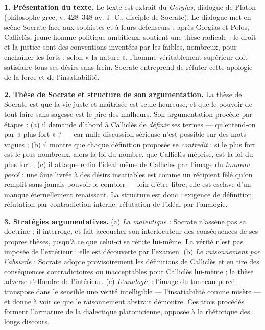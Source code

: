 \documentclass[11pt]{article}
\begin{document}
\begin{corrige}
\tcblower

\textbf{1. Présentation du texte.} Le texte est extrait du \emph{Gorgias}, dialogue de Platon (philosophe grec, v. 428--348 av. J.-C., disciple de Socrate). Le dialogue met en scène Socrate face aux sophistes et à leurs défenseurs : après Gorgias et Polos, Calliclès, jeune homme politique ambitieux, soutient une thèse radicale : le droit et la justice sont des conventions inventées par les faibles, nombreux, pour enchaîner les forts ; selon « la nature », l'homme véritablement supérieur doit satisfaire tous ses désirs sans frein. Socrate entreprend de réfuter cette apologie de la force et de l'insatiabilité.

\textbf{2. Thèse de Socrate et structure de son argumentation.} La thèse de Socrate est que la vie juste et maîtrisée est seule heureuse, et que le pouvoir de tout faire sans sagesse est le pire des malheurs. Son argumentation procède par étapes : (a) il demande d'abord à Calliclès de \emph{définir} ses termes --- qu'entend-on par « plus fort » ? --- car nulle discussion sérieuse n'est possible sur des mots vagues ; (b) il montre que chaque définition proposée se \emph{contredit} : si le plus fort est le plus nombreux, alors la loi du nombre, que Calliclès méprise, est la loi du plus fort ; (c) il attaque enfin l'idéal même de Calliclès par l'image du \emph{tonneau percé} : une âme livrée à des désirs insatiables est comme un récipient fêlé qu'on remplit sans jamais pouvoir le combler --- loin d'être libre, elle est esclave d'un manque éternellement renaissant. La structure est donc : exigence de définition, réfutation par contradiction interne, réfutation de l'idéal par l'analogie.

\textbf{3. Stratégies argumentatives.} (a) \emph{La maïeutique} : Socrate n'assène pas sa doctrine ; il interroge, et fait accoucher son interlocuteur des conséquences de ses propres thèses, jusqu'à ce que celui-ci se réfute lui-même. La vérité n'est pas imposée de l'extérieur : elle est découverte par l'examen. (b) \emph{Le raisonnement par l'absurde} : Socrate adopte provisoirement les définitions de Calliclès et en tire des conséquences contradictoires ou inacceptables pour Calliclès lui-même ; la thèse adverse s'effondre de l'intérieur. (c) \emph{L'analogie} : l'image du tonneau percé transpose dans le sensible une vérité intelligible --- l'insatiabilité comme misère --- et donne à voir ce que le raisonnement abstrait démontre. Ces trois procédés forment l'armature de la dialectique platonicienne, opposée à la rhétorique des longs discours.


\end{corrige}
\end{document}
